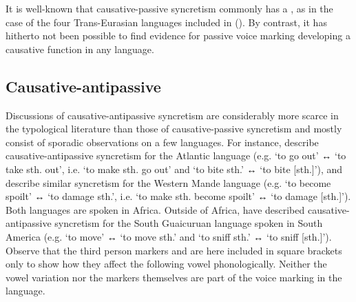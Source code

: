 It is well-known that causative-passive syncretism commonly has a , as in the case of the four Trans-Eurasian languages included in  (). By contrast, it has hitherto not been possible to find evidence for passive voice marking developing a causative function in any language.

\subsection{Causative-antipassive} \label{sec:simple-syncretism:caus-antp}
Discussions of causative-antipassive syncretism are considerably more scarce in the typological literature than those of causative-passive syncretism and mostly consist of sporadic observations on a few languages. For instance, \citet[295ff.]{creissels:nouguier-voisin:2008} describe causative-antipassive syncretism for the Atlantic language  (e.g.  ‘to go out’ ↔  ‘to take sth. out’, i.e. ‘to make sth. go out’ and  ‘to bite sth.’ ↔  ‘to bite [sth.]’), and \citet[20]{creissels:diagne:2013} describe similar syncretism for the Western Mande language  (e.g.  ‘to become spoilt’ ↔  ‘to damage sth.’, i.e. ‘to make sth. become spoilt’ ↔  ‘to damage [sth.]’). Both languages are spoken in Africa. Outside of Africa, \citet[240, 244f.]{juarez:gonzalez:2017} have described causative-antipassive syncretism for the South Guaicuruan language  spoken in South America (e.g.  ‘to move’ ↔  ‘to move sth.’ and  ‘to sniff sth.’ ↔  ‘to sniff [sth.]’). Observe that the third person  markers  and  are here included in square brackets only to show how they affect the following vowel phonologically. Neither the vowel variation nor the  markers themselves are part of the voice marking in the language.

